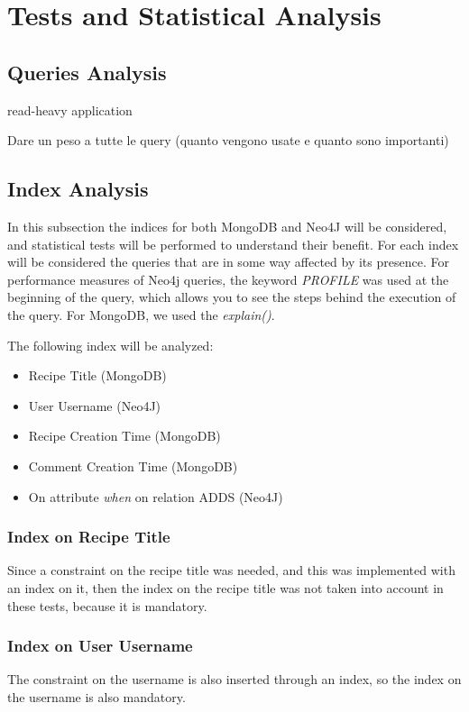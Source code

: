 \documentclass[a4paper]{report}
\begin{document}
\section{Tests and Statistical Analysis}
\subsection{Queries Analysis}
read-heavy application

Dare un peso a tutte le query (quanto vengono usate e quanto sono importanti)

\subsection{Index Analysis}

In this subsection the indices for both MongoDB and Neo4J will be considered, and statistical tests will be performed to understand their benefit. For each index will be considered the queries that are in some way affected by its presence. For performance measures of Neo4j queries, the keyword \emph{PROFILE} was used at the beginning of the query, which allows you to see the steps behind the execution of the query. For MongoDB, we used the \emph{explain()}.

\noindent The following index will be analyzed:
\begin{itemize}
	\item Recipe Title (MongoDB)
	\item User Username (Neo4J)
	\item Recipe Creation Time (MongoDB)
	\item Comment Creation Time (MongoDB)
	\item On attribute \emph{when} on relation ADDS (Neo4J)	
\end{itemize}

\subsubsection {Index on Recipe Title}
Since a constraint on the recipe title was needed, and this was implemented with an index on it, then the index on the recipe title was not taken into account in these tests, because it is mandatory.

\subsubsection {Index on User Username}
The constraint on the username is also inserted through an index, so the index on the username is also mandatory.
\end{document}
